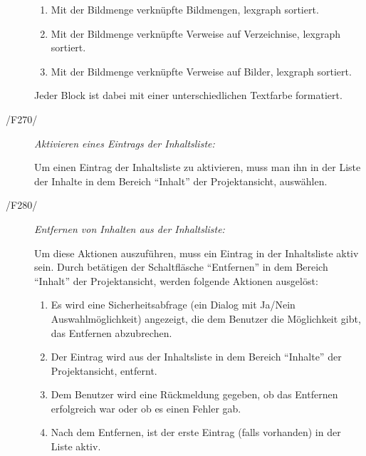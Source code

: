 \begin{description}
			\begin{enumerate}
			
				\item Mit der Bildmenge verknüpfte Bildmengen, \gls{lexgraph} sortiert.
			
				\item Mit der Bildmenge verknüpfte Verweise auf Verzeichnise, \gls{lexgraph} sortiert.
				
				\item Mit der Bildmenge verknüpfte Verweise auf Bilder, \gls{lexgraph} sortiert.
				
			\end{enumerate}
			
			Jeder Block ist dabei mit einer unterschiedlichen Textfarbe formatiert.
		
		\item[/F270/] \textit{Aktivieren eines Eintrags der Inhaltsliste:}\par Um einen Eintrag der Inhaltsliste zu aktivieren, muss man ihn in der Liste der Inhalte in dem Bereich "`Inhalt"' der Projektansicht, auswählen.
		
		\item[/F280/] \textit{Entfernen von Inhalten aus der Inhaltsliste:}\par Um diese Aktionen auszuführen, muss ein Eintrag in der Inhaltsliste aktiv sein. Durch betätigen der Schaltfläsche "`Entfernen"' in dem Bereich "`Inhalt"' der Projektansicht, werden folgende Aktionen ausgelöst:
			
			\begin{enumerate}
			
				\item Es wird eine Sicherheitsabfrage (ein Dialog mit Ja/Nein Auswahlmöglichkeit) angezeigt, die dem Benutzer die Möglichkeit gibt, das Entfernen abzubrechen.
				
				\item Der Eintrag wird aus der Inhaltsliste in dem Bereich "`Inhalte"' der Projektansicht, entfernt.
				
				\item Dem Benutzer wird eine Rückmeldung gegeben, ob das Entfernen erfolgreich war oder ob es einen Fehler gab.
				
				\item Nach dem Entfernen, ist der erste Eintrag (falls vorhanden) in der Liste aktiv.
			
			\end{enumerate}
		

\end{description}
